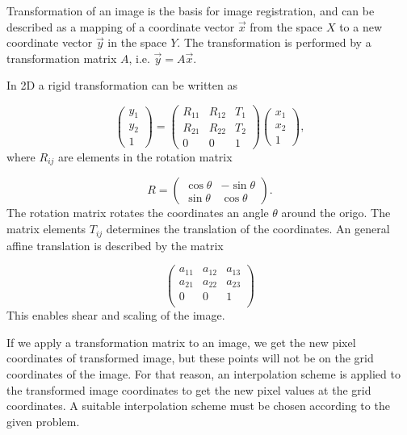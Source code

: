 Transformation of an image is the basis for image registration, and can be described as a mapping of a coordinate vector $\vec{x}$ from the space $X$ to a new coordinate vector $\vec{y}$ in the space $Y$. The transformation is performed by a transformation matrix $A$, i.e. $\vec{y} = A\vec{x}$.

In 2D a rigid transformation can be written as 

\begin{equation}
	\label{rigid}
	\begin{pmatrix}
		y_1 \\
		y_2 \\
		1 
	\end{pmatrix}
	=
	\begin{pmatrix}
		R_{11} & R_{12} & T_1\\
		R_{21} & R_{22} & T_2\\		
		0 & 0 & 1
	\end{pmatrix}
	\begin{pmatrix}
		x_1\\
		x_2\\
		1
	\end{pmatrix},
\end{equation}
where $R_{ij}$ are elements in the rotation matrix 

\begin{equation}
	R = 
	\begin{pmatrix}
	\cos \theta & -\sin \theta\\
	\sin \theta & \cos \theta
	\end{pmatrix}.
\end{equation}
The rotation matrix rotates the coordinates an angle $\theta$ around the origo. The matrix elements $T_{ij}$ determines the translation of the coordinates. An general affine translation is described by the matrix

\begin{equation}
\begin{pmatrix}
 a_{11}&a_{12}&a_{13}\\
 a_{21}&a_{22}&a_{23}\\
 0&0&1\\
 
\end{pmatrix}
\end{equation} 
This enables shear and scaling of the image.

If we apply a transformation matrix to an image, we get the new pixel coordinates of transformed image, but these points will not be on the grid coordinates of the image. For that reason, an interpolation scheme is applied to the transformed image coordinates to get the new pixel values at the grid coordinates. A suitable interpolation scheme must be chosen according to the given problem.

